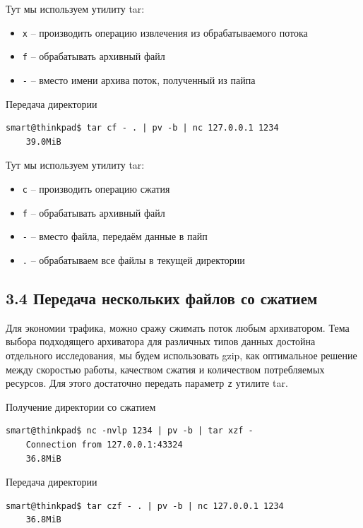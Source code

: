 Тут мы используем утилиту tar:

\begin{itemize}
    \item \texttt{x} -- производить операцию извлечения из обрабатываемого потока
    \item \texttt{f} -- обрабатывать архивный файл
    \item \texttt{-} -- вместо имени архива поток, полученный из пайпа
\end{itemize}

Передача директории
\begin{Verbatim}[frame=single,breaklines=true,breakanywhere=true]
    smart@thinkpad$ tar cf - . | pv -b | nc 127.0.0.1 1234
    39.0MiB
\end{Verbatim}

Тут мы используем утилиту tar:

\begin{itemize}
    \item \texttt{с} -- производить операцию сжатия
    \item \texttt{f} -- обрабатывать архивный файл
    \item \texttt{-} -- вместо файла, передаём данные в пайп
    \item \texttt{.} -- обрабатываем все файлы в текущей директории
\end{itemize}

\subsection*{3.4 Передача нескольких файлов со сжатием}

Для экономии трафика, можно сражу сжимать поток любым архиватором. Тема выбора подходящего архиватора для различных типов данных достойна отдельного исследования, мы будем использовать gzip, как оптимальное решение между скоростью работы, качеством сжатия и количеством потребляемых ресурсов. Для этого достаточно передать параметр \texttt{z} утилите tar.

Получение директории со сжатием
\begin{Verbatim}[frame=single,breaklines=true,breakanywhere=true]
    smart@thinkpad$ nc -nvlp 1234 | pv -b | tar xzf -
    Connection from 127.0.0.1:43324
    36.8MiB
\end{Verbatim}

Передача директории
\begin{Verbatim}[frame=single,breaklines=true,breakanywhere=true]
    smart@thinkpad$ tar czf - . | pv -b | nc 127.0.0.1 1234
    36.8MiB
\end{Verbatim}

